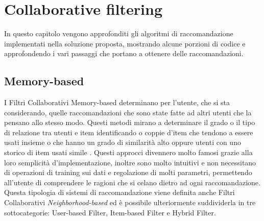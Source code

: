\chapter{Collaborative filtering}\label{chp:03-recommendationSystems}
In questo capitolo vengono approfonditi gli algoritmi di raccomandazione implementati nella soluzione proposta, mostrando alcune porzioni di 
codice e approfondendo i vari passaggi che portano a ottenere delle raccomandazioni.
%
\section{Memory-based}
I Filtri Collaborativi Memory-based determinano per l'utente, che si sta considerando, quelle raccomandazioni che sono state fatte 
ad altri utenti che la pensano allo stesso modo. Questi metodi mirano a determinare il grado o il tipo di relazione tra utenti e 
item identificando o coppie d'item che tendono a essere usati insieme o che hanno un grado di similarità alto oppure utenti 
con uno storico di item usati simile \cite{taxonomy-of-recommender-agents-on-the-internet}.
Questi approcci divennero molto famosi grazie alla loro semplicità d'implementazione, inoltre sono molto intuitivi e non necessitano di operazioni 
di training sui dati e regolazione di molti parametri, permettendo all'utente di comprendere le ragioni che si celano dietro 
ad ogni raccomandazione.\hfill\break
Questa tipologia di sistemi di raccomandazione viene definita anche Filtri Collaborativi \textit{Neighborhood-based} ed è possibile ulteriormente 
suddividerla in tre sottocategorie: User-based Filter, Item-based Filter e Hybrid Filter.
%
